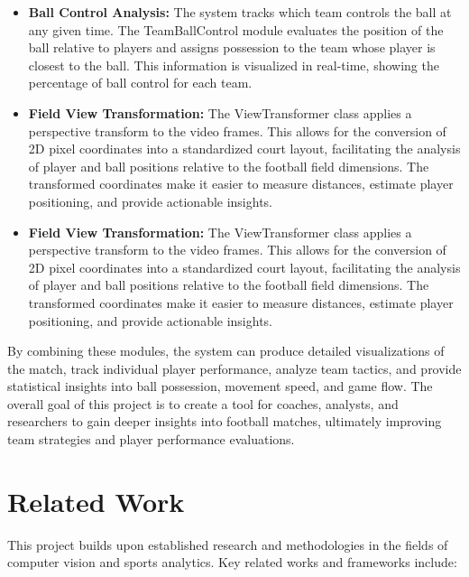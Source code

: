 \begin{itemize}
    \item \textbf{Ball Control Analysis:} The system tracks which team controls the ball at any given time. The TeamBallControl module evaluates the position of the ball relative to players and assigns possession to the team whose player is closest to the ball. This information is visualized in real-time, showing the percentage of ball control for each team.
    
    \item \textbf{Field View Transformation:} The ViewTransformer class applies a perspective transform to the video frames. This allows for the conversion of 2D pixel coordinates into a standardized court layout, facilitating the analysis of player and ball positions relative to the football field dimensions. The transformed coordinates make it easier to measure distances, estimate player positioning, and provide actionable insights.


    \item \textbf{Field View Transformation:} The ViewTransformer class applies a perspective transform to the video frames. This allows for the conversion of 2D pixel coordinates into a standardized court layout, facilitating the analysis of player and ball positions relative to the football field dimensions. The transformed coordinates make it easier to measure distances, estimate player positioning, and provide actionable insights.
    
\end{itemize}

By combining these modules, the system can produce detailed visualizations of the match, track individual player performance, analyze team tactics, and provide statistical insights into ball possession, movement speed, and game flow. The overall goal of this project is to create a tool for coaches, analysts, and researchers to gain deeper insights into football matches, ultimately improving team strategies and player performance evaluations.



\section{Related Work}
\label{sec:related_work}

This project builds upon established research and methodologies in the fields of computer vision and sports analytics. Key related works and frameworks include:

